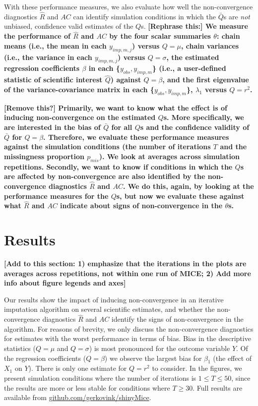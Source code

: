 \documentclass[Royal,times,sageh]{sagej}
\begin{document}
With these performance measures, we also evaluate how well the non-convergence diagnostics \(\widehat{R}\) and \(AC\) can identify simulation conditions in which the \(\bar{Q}\)s are \emph{not} unbiased, confidence valid estimates of the \(Q\)s. \textbf{{[}Rephrase this:{]} We measure the performance of \(\widehat{R}\) and \(AC\) by the four scalar summaries \(\theta\): chain means (i.e., the mean in each \(y_{imp, m, j}\)) versus \(Q=\mu\), chain variances (i.e., the variance in each \(y_{imp, m, j}\)) versus \(Q=\sigma\), the estimated regression coefficients \(\beta\) in each \{\(y_{obs}, y_{imp, m}\)\} (i.e., a user-defined statistic of scientific interest \(\hat{Q}\)) against \(Q=\beta\), and the first eigenvalue of the variance-covariance matrix in each \{\(y_{obs}, y_{imp, m}\)\}, \(\lambda_1\) versus \(Q=r^2\).}

\textbf{{[}Remove this?{]} Primarily, we want to know what the effect is of inducing non-convergence on the estimated \(Q\)s. More specifically, we are interested in the bias of \(\bar{Q}\) for all \(Q\)s and the confidence validity of \(\bar{Q}\) for \(Q=\beta\). Therefore, we evaluate these performance measures against the simulation conditions (the number of iterations \(T\) and the missingness proportion \(p_{mis}\)). We look at averages across simulation repetitions. Secondly, we want to know if conditions in which the \(Q\)s are affected by non-convergence are also identified by the non-convergence diagnostics \(\widehat{R}\) and \(AC\). We do this, again, by looking at the performance measures for the \(Q\)s, but now we evaluate these against what \(\widehat{R}\) and \(AC\) indicate about signs of non-convergence in the \(\theta\)s.}

\hypertarget{results}{%
\section{Results}\label{results}}

\textbf{{[}Add to this section: 1) emphasize that the iterations in the plots are averages across repetitions, not within one run of MICE; 2) Add more info about figure legends and axes{]}}

Our results show the impact of inducing non-convergence in an iterative imputation algorithm on several scientific estimates, and whether the non-convergence diagnostics \(\widehat{R}\) and \(AC\) identify the signs of non-convergence in the algorithm. For reasons of brevity, we only discuss the non-convergence diagnostics for estimates with the worst performance in terms of bias. Bias in the descriptive statistics (\(Q=\mu\) and \(Q=\sigma\)) is most pronounced for the outcome variable \(Y\). Of the regression coefficients (\(Q=\beta\)) we observe the largest bias for \(\beta_1\) (the effect of \(X_1\) on \(Y\)). There is only one estimate for \(Q=r^2\) to consider. In the figures, we present simulation conditions where the number of iterations is \(1 \leq T\leq50\), since the results are more or less stable for conditions where \(T \geq 30\). Full results are available from \href{https://github.com/gerkovink/shinyMice/tree/master/3.Thesis/1.SimulationStudy}{github.com/gerkovink/shinyMice}.
\end{document}
